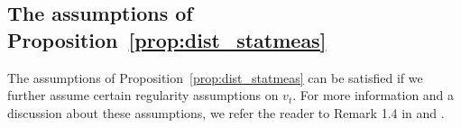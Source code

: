 
\subsection{The assumptions of Proposition~\ref{prop:dist_statmeas}}

The assumptions of Proposition~\ref{prop:dist_statmeas} can be satisfied if we further assume certain regularity assumptions on $v_t$. For more information and a discussion about these assumptions, we refer the reader to Remark 1.4 in \cite{bogachev2016distances} and \cite{bogachev2006global,bogachev2008estimates}.



